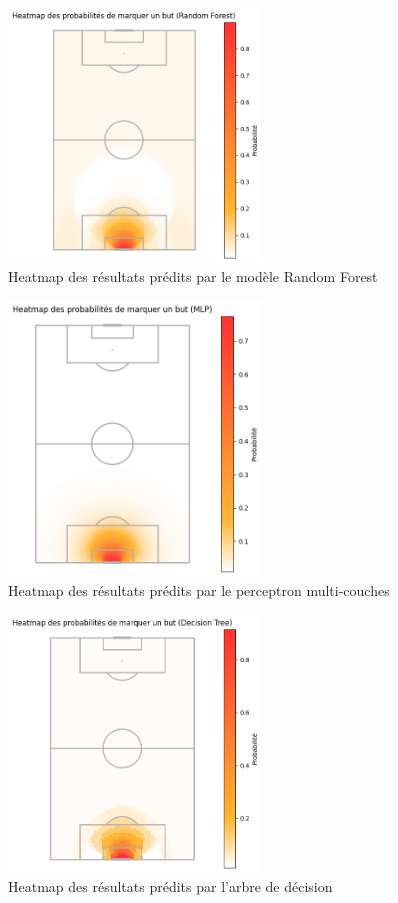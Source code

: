 \documentclass[12pt]{article}
\begin{document}
\begin{figure}[htp]
    \centering
    \includegraphics[width=0.6\textwidth]{img/pitch_visualisation_random_forest.png}
    \caption{Heatmap des résultats prédits par le modèle Random Forest}
    \label{fig:result_random_forest}
\end{figure}

\begin{figure}[htp]
    \centering
    \includegraphics[width=0.6\textwidth]{img/pitch_visualisation_mlp.png}
    \caption{Heatmap des résultats prédits par le perceptron multi-couches}
    \label{fig:result_mlp}
\end{figure}

\begin{figure}[htp]
    \centering
    \includegraphics[width=0.6\textwidth]{img/pitch_visualisation_tree.png}
    \caption{Heatmap des résultats prédits par l'arbre de décision}
    \label{fig:result_tree}
\end{figure}
\end{document}
